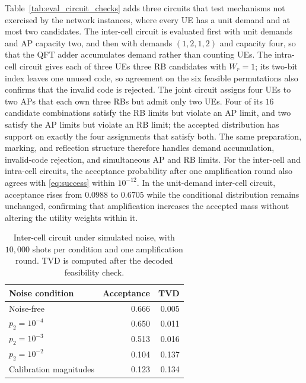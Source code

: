 Table~\ref{tab:eval_circuit_checks} adds three circuits that test mechanisms not exercised by the network instances, where every UE has a unit demand and at most two candidates. The inter-cell circuit is evaluated first with unit demands and AP capacity two, and then with demands $(1,2,1,2)$ and capacity four, so that the QFT adder accumulates demand rather than counting UEs. The intra-cell circuit gives each of three UEs three RB candidates with $W_r=1$; its two-bit index leaves one unused code, so agreement on the six feasible permutations also confirms that the invalid code is rejected. The joint circuit assigns four UEs to two APs that each own three RBs but admit only two UEs. Four of its $16$ candidate combinations satisfy the RB limits but violate an AP limit, and two satisfy the AP limits but violate an RB limit; the accepted distribution has support on exactly the four assignments that satisfy both. The same preparation, marking, and reflection structure therefore handles demand accumulation, invalid-code rejection, and simultaneous AP and RB limits. For the inter-cell and intra-cell circuits, the acceptance probability after one amplification round also agrees with \eqref{eq:success} within $10^{-12}$. In the unit-demand inter-cell circuit, acceptance rises from $0.0988$ to $0.6705$ while the conditional distribution remains unchanged, confirming that amplification increases the accepted mass without altering the utility weights within it.

\begin{table}[!t]
\centering
\caption{Inter-cell circuit under simulated noise, with $10{,}000$ shots per condition and one amplification round. TVD is computed after the decoded feasibility check.}
\label{tab:eval_noise}
\footnotesize
\begin{tabular}{lrr}
\toprule
Noise condition & Acceptance & TVD \\
\midrule
Noise-free & 0.666 & 0.005 \\
$p_2=10^{-4}$ & 0.650 & 0.011 \\
$p_2=10^{-3}$ & 0.513 & 0.016 \\
$p_2=10^{-2}$ & 0.104 & 0.137 \\
Calibration magnitudes & 0.123 & 0.134 \\
\bottomrule
\end{tabular}
\end{table}

